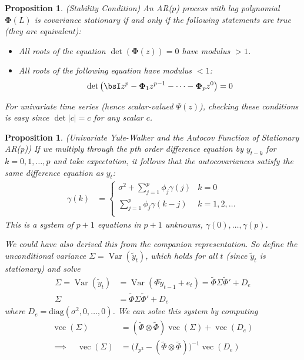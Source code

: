 \documentclass[12pt]{article}
\theoremstyle{plain}
\newtheorem{prop}[thm]{Proposition}
\theoremstyle{definition}
\theoremstyle{remark}
\newcommand{\diag}{\text{diag}}
\newcommand{\bsPhi}{\boldsymbol{\Phi}}
\newcommand{\vc}{\operatorname{vec}}
\newcommand{\Var}{\operatorname{Var}}
\begin{document}
\begin{prop}\emph{(Stability Condition)}
\label{prop:stationaryar}
An AR($p$) process with lag polynomial $\bsPhi(L)$ is covariance
stationary if and only if the following statements are true (they are
equivalent):
\begin{itemize}
  \item
    All roots of the equation $\det(\bsPhi(z)) = 0$ have modulus $>1$.
  \item
    All roots of the following equation have modulus $<1$:
    \begin{align*}
      \det\big(
        \bsI z^p - \bsPhi_1z^{p-1}
        - \cdots - \bsPhi_p z^0
      \big)
      =0
    \end{align*}
\end{itemize}
For univariate time series (hence scalar-valued $\Psi(z)$), checking
these conditions is easy since $\det|c|=c$ for any scalar $c$.
\end{prop}


\begin{prop}
\emph{(Univariate Yule-Walker and the Autocov Function of Stationary AR(p))}
If we multiply through the $p$th order difference equation by $y_{t-k}$
for $k=0,1,\ldots,p$ and take expectation, it follows that the
autocovariances satisfy the same difference equation as $y_t$:
\begin{align*}
  \gamma(k)
  &=
  \begin{cases}
    \sigma^2 + \sum_{j=1}^p \phi_j\gamma(j)
    & k = 0 \\
    \sum_{j=1}^p \phi_j\gamma(k-j)
    & k = 1,2,\ldots \\
  \end{cases}
\end{align*}
This is a system of $p+1$ equations in $p+1$ unknowns,
$\gamma(0),\ldots,\gamma(p)$.

We could have also derived this from the companion representation. So
define the unconditional variance $\Sigma=\Var(\tilde{y}_t)$, which
holds for all $t$ (since $\tilde{y}_t$ is stationary) and solve
\begin{align*}
  \Sigma = \Var(\tilde{y}_t)
  &= \Var(\Phi \tilde{y}_{t-1} + e_t)
  = \tilde{\Phi} \Sigma\tilde{\Phi}' + D_e \\
  \Sigma
  &= \tilde{\Phi} \Sigma\tilde{\Phi}' + D_e
\end{align*}
where $D_e=\diag(\sigma^2,0,\ldots,0)$. We can solve this system by
computing
\begin{align*}
  \vc(\Sigma) &= (\tilde{\Phi}\otimes\tilde{\Phi})\vc(\Sigma) + \vc(D_e) \\
  \implies\quad
  \vc(\Sigma) &= \big(I_{p^2}-(\tilde{\Phi}\otimes\tilde{\Phi})\big)^{-1}\vc(D_e)
\end{align*}

\end{prop}
\end{document}
